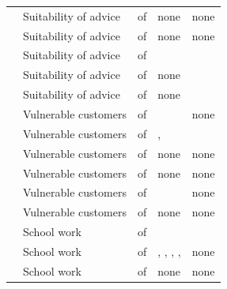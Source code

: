 \begin{table}[t]
\begin{tabular}{llcP{0.4\textwidth}P{0.2\textwidth}}
 & Suitability of advice & \JudgementConsensusSplitSTwo{} of \JudgementConsensusValidSTwo{} & none & none \\
 & Suitability of advice & \JudgementConsensusSplitSThree{} of \JudgementConsensusValidSThree{} & none & none \\
 & Suitability of advice & \JudgementConsensusSplitSFour{} of \JudgementConsensusValidSFour{} &  &  \\
 & Suitability of advice & \JudgementConsensusSplitSFive{} of \JudgementConsensusValidSFive{} & none &  \\
 & Suitability of advice & \JudgementConsensusSplitSSix{} of \JudgementConsensusValidSSix{} & none &  \\
 & Vulnerable customers & \JudgementConsensusSplitVOne{} of \JudgementConsensusValidVOne{} &  & none \\
 & Vulnerable customers & \JudgementConsensusSplitVTwo{} of \JudgementConsensusValidVTwo{} & ,  &  \\
 & Vulnerable customers & \JudgementConsensusSplitVThree{} of \JudgementConsensusValidVThree{} & none & none \\
 & Vulnerable customers & \JudgementConsensusSplitVFour{} of \JudgementConsensusValidVFour{} & none & none \\
 & Vulnerable customers & \JudgementConsensusSplitVFive{} of \JudgementConsensusValidVFive{} &  & none \\
 & Vulnerable customers & \JudgementConsensusSplitVSix{} of \JudgementConsensusValidVSix{} & none & none \\
 & School work & \JudgementConsensusSplitWOne{} of \JudgementConsensusValidWOne{} &  &  \\
 & School work & \JudgementConsensusSplitWTwo{} of \JudgementConsensusValidWTwo{} & , , , ,  & none \\
 & School work & \JudgementConsensusSplitWThree{} of \JudgementConsensusValidWThree{} & none & none \\

\end{tabular}
\end{table}
